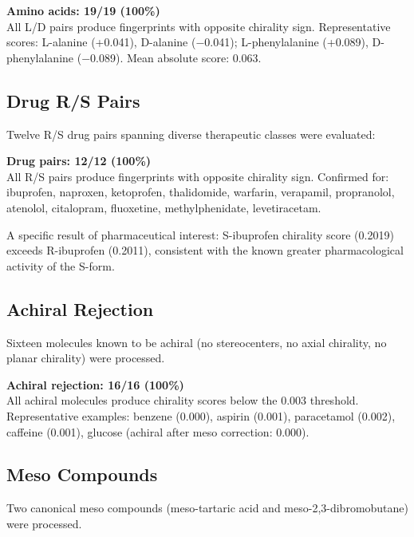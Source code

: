 \documentclass[11pt,a4paper]{article}
\begin{document}
\begin{keyresult}
\textbf{Amino acids: 19/19 (100\%)} \\[4pt]
All L/D pairs produce fingerprints with opposite chirality sign. Representative
scores: L-alanine (+0.041), D-alanine ($-$0.041); L-phenylalanine (+0.089),
D-phenylalanine ($-$0.089). Mean absolute score: 0.063.
\end{keyresult}

\subsection{Drug R/S Pairs}

Twelve R/S drug pairs spanning diverse therapeutic classes were evaluated:

\begin{keyresult}
\textbf{Drug pairs: 12/12 (100\%)} \\[4pt]
All R/S pairs produce fingerprints with opposite chirality sign. Confirmed for:
ibuprofen, naproxen, ketoprofen, thalidomide, warfarin, verapamil, propranolol,
atenolol, citalopram, fluoxetine, methylphenidate, levetiracetam.
\end{keyresult}

A specific result of pharmaceutical interest: S-ibuprofen chirality score
(0.2019) exceeds R-ibuprofen (0.2011), consistent with the known greater
pharmacological activity of the S-form.

\subsection{Achiral Rejection}

Sixteen molecules known to be achiral (no stereocenters, no axial chirality,
no planar chirality) were processed.

\begin{keyresult}
\textbf{Achiral rejection: 16/16 (100\%)} \\[4pt]
All achiral molecules produce chirality scores below the 0.003 threshold.
Representative examples: benzene (0.000), aspirin (0.001), paracetamol (0.002),
caffeine (0.001), glucose (achiral after meso correction: 0.000).
\end{keyresult}

\subsection{Meso Compounds}

Two canonical meso compounds (meso-tartaric acid and meso-2,3-dibromobutane)
were processed.
\end{document}
